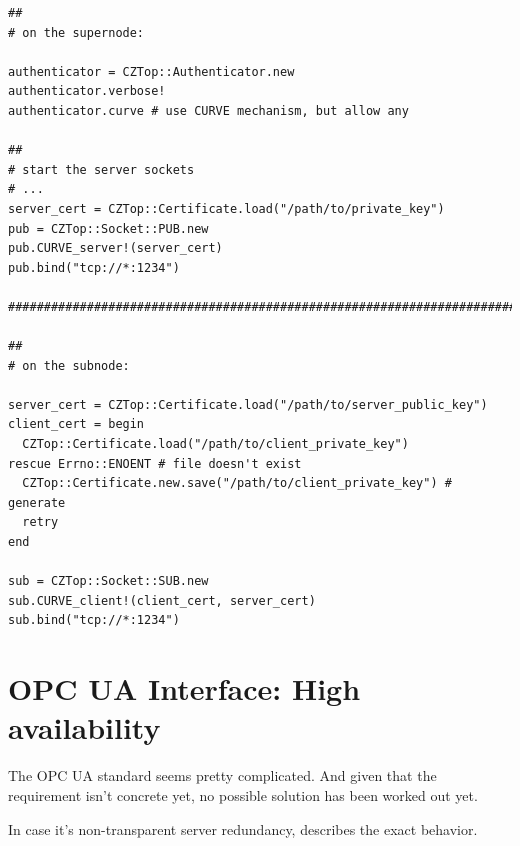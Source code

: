 \begin{lstlisting}[style=customruby,caption={Starting an authentication handler that allows any clients}, label={lst:auth:any}]
##
# on the supernode:

authenticator = CZTop::Authenticator.new
authenticator.verbose!
authenticator.curve # use CURVE mechanism, but allow any

##
# start the server sockets
# ...
server_cert = CZTop::Certificate.load("/path/to/private_key")
pub = CZTop::Socket::PUB.new
pub.CURVE_server!(server_cert)
pub.bind("tcp://*:1234")

#############################################################################

##
# on the subnode:

server_cert = CZTop::Certificate.load("/path/to/server_public_key")
client_cert = begin
  CZTop::Certificate.load("/path/to/client_private_key")
rescue Errno::ENOENT # file doesn't exist
  CZTop::Certificate.new.save("/path/to/client_private_key") # generate
  retry
end

sub = CZTop::Socket::SUB.new
sub.CURVE_client!(client_cert, server_cert)
sub.bind("tcp://*:1234")
\end{lstlisting}

\section{OPC UA Interface: High availability}\label{sec:approach:opc-ua}
The OPC UA standard seems pretty complicated. And given that the requirement
isn't concrete yet, no possible solution has been worked out yet.

In case it's non-transparent server redundancy, \cite[6.4.2.4 Non-transparent
Redundancy, p.~96]{opc-ua:behavior:server-redundancy} describes the exact
behavior.

